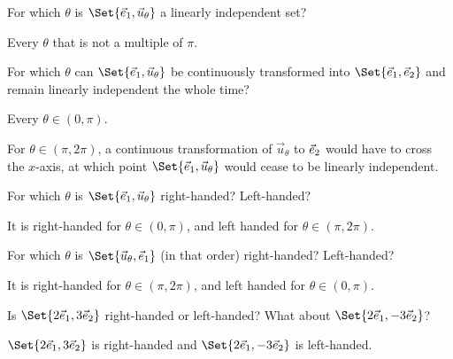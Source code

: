 \documentclass{problemset}
\begin{document}
	\begin{parts}
		\item For which $\theta$ is $\Set{\xhat,\vec u_{\theta}}$ a linearly independent set?
			\begin{solution}[inline]
				Every $\theta$ that is not a multiple of $\pi$.
			\end{solution}
		\item For which $\theta$ can $\Set{\xhat,\vec u_{\theta}}$ be continuously
			transformed into $\Set{\xhat,\yhat}$ and remain linearly independent the
			whole time?
			\begin{solution}
				Every $\theta \in (0, \pi)$.

				For $\theta\in(\pi,2\pi)$, a continuous transformation of
				$\vec u_\theta$	to ${\vec e_2}$ would have to cross the $x$-axis,
				at which point $\Set{\xhat,\vec u_\theta}$ would cease to be
				linearly independent.
			\end{solution}
		\item For which $\theta$ is $\Set{\xhat,\vec u_{\theta}}$ right-handed?
			Left-handed?
			\begin{solution}
				It is right-handed for $\theta\in(0, \pi)$, and left handed for
				$\theta\in(\pi,2\pi)$.
			\end{solution}
		\item For which $\theta$ is $\Set{\vec u_{\theta},\xhat}$ (in that order)
			right-handed? Left-handed?
			\begin{solution}
				It is right-handed for $\theta\in(\pi,2\pi)$, and left handed
				for $\theta\in(0,\pi)$.
			\end{solution}
		\item Is $\Set{2\xhat, 3\yhat}$ right-handed or left-handed? What about $\Set{2\xhat, -3\yhat}$?
			\begin{solution}
				$\Set{2\xhat, 3\yhat}$ is right-handed and $\Set{2\xhat, -3\yhat}$ is left-handed.
			\end{solution}
	\end{parts}
\end{document}
